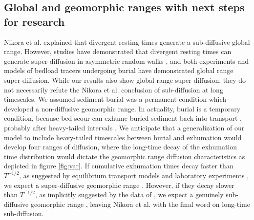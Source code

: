 \subsection{Global and geomorphic ranges with next steps for research}

Nikora et al. explained that divergent resting times generate a sub-diffusive global range.
However, studies have demonstrated that divergent resting times can generate super-diffusion in asymmetric random walks \citep{Weeks1996,Weeks1998}, and both experiments \citep{Bradley2017,Bradley2010} and models \citep{Pelosi2016,Wu2019,Wu2019a} of bedload tracers undergoing burial have demonstrated global range super-diffusion.
While our results also show global range super-diffusion, they do not necessarily refute the Nikora et al. conclusion of sub-diffusion at long timescales.
We assumed sediment burial was a permanent condition which developed a non-diffusive geomorphic range.
In actuality, burial is a temporary condition, because bed scour can exhume buried sediment back into transport \citep{Wu2019a}, probably after heavy-tailed intervals \citep{Voepel2013,Martin2014,Pierce2020}.
We anticipate that a generalization of our model to include heavy-tailed timescales between burial and exhumation would develop four ranges of diffusion, where the long-time decay of the exhumation time distribution would dictate the geomorphic range diffusion characteristics as depicted in figure \ref{fig:var}.
If cumulative exhumation times decay faster than $T^{-1/2}$, as suggested by equilibrium transport models \citep{Voepel2013, Martin2014, Pierce2020} and laboratory experiments \citep{Martin2014,Martin2012}, we expect a super-diffusive geomorphic range \citep{Weeks1998}.
However, if they decay slower than $T^{-1/2}$, as implicitly suggested by the data of \citet{Olinde2015}, we expect a genuinely sub-diffusive geomorphic range \citep{Weeks1998}, leaving Nikora et al. with the final word on long-time sub-diffusion.

